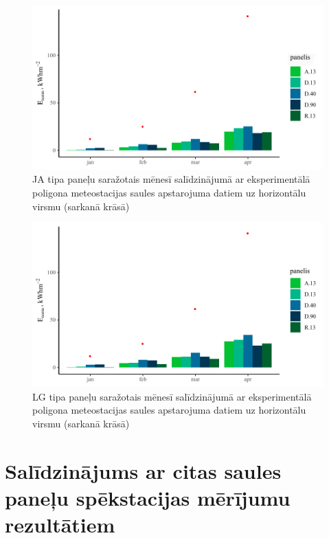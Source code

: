 \begin{figure}[h!]
    \centering
    \includegraphics[width=\linewidth]{figures/results/JAm2_w.pdf}
    \caption{JA tipa paneļu saražotais mēnesī salīdzinājumā ar eksperimentālā poligona meteostacijas saules apstarojuma datiem uz horizontālu virsmu (\textcolor{bostonuniversityred}{sarkanā krāsā})}
    \label{fig:ja}
\end{figure}
\begin{figure}[h!]
    \centering
    \includegraphics[width=\linewidth]{figures/results/LGm2_w.pdf}
    \caption{LG tipa paneļu saražotais mēnesī salīdzinājumā ar eksperimentālā poligona meteostacijas saules apstarojuma datiem uz horizontālu virsmu (\textcolor{bostonuniversityred}{sarkanā krāsā})}
    \label{fig:lg}
\end{figure}

\section{Salīdzinājums ar citas saules paneļu spēkstacijas mērījumu rezultātiem}

